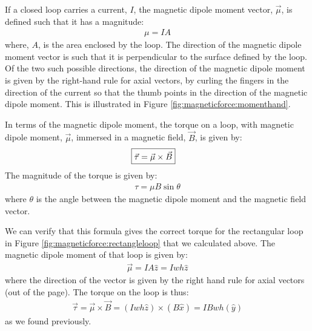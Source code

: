 If a closed loop carries a current, $I$, the magnetic dipole moment vector, $\vec \mu$, is defined such that it has a magnitude:
\begin{align*}
\mu = IA
\end{align*}
where, $A$, is the area enclosed by the loop. The direction of the magnetic dipole moment vector is such that it is perpendicular to the surface defined by the loop. Of the two such possible directions, the direction of the magnetic dipole moment is given by the right-hand rule for axial vectors, by curling the fingers in the direction of the current so that the thumb points in the direction of the magnetic dipole moment. This is illustrated in Figure \ref{fig:magneticforce:momenthand}.

In terms of the magnetic dipole moment, the torque on a loop, with magnetic dipole moment, $\vec \mu$, immersed in a magnetic field, $\vec B$, is given by:
\begin{align*}
\Aboxed{\vec \tau = \vec \mu \times \vec B}
\end{align*}
The magnitude of the torque is given by:
\begin{align*}
\tau =\mu B \sin\theta
\end{align*}
where $\theta$ is the angle between the magnetic dipole moment and the magnetic field vector.

We can verify that this formula gives the correct torque for the rectangular loop in Figure \ref{fig:magneticforce:rectangleloop} that we calculated above. The magnetic dipole moment of that loop is given by:
\begin{align*}
\vec \mu = IA \hat z = Iwh\hat z
\end{align*}
where the direction of the vector is given by the right hand rule for axial vectors (out of the page). The torque on the loop is thus:
\begin{align*}
\vec \tau = \vec \mu \times \vec B = (Iwh\hat z) \times (B\hat x) = IBwh (\hat y)
\end{align*}
as we found previously.

